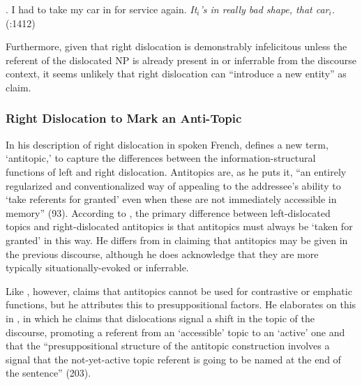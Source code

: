 \documentclass[titlepage,12pt]{article}
\begin{document}
\ex. I had to take my car in for service again. \textit{It$_i$'s in really bad shape, that car$_i$.}\\
\phantom{x}\hfill (\citealt{huddleston_cambridge_2002}:1412)

Furthermore, given that right dislocation is demonstrably infelicitous unless the referent of the dislocated NP is already present in or inferrable from the discourse context, it seems unlikely that right dislocation can ``introduce a new entity'' as \citeauthor{ziv_right_1994} claim. 

\subsubsection{Right Dislocation to Mark an Anti-Topic}

In his description of right dislocation in spoken French, \citet{lambrecht_topic_1981} defines a new term, `antitopic,' to capture the differences between the information-structural functions of left and right dislocation. Antitopics are, as he puts it, ``an entirely regularized and conventionalized way of appealing to the addressee's ability to `take referents for granted' even when these are not immediately accessible in memory'' (93). According to \citeauthor{lambrecht_topic_1981}, the primary difference between left-dislocated topics and right-dislocated antitopics is that antitopics must always be `taken for granted' in this way. He differs from \citet{ziv_right_1994} in claiming that antitopics may be given in the previous discourse, although he does acknowledge that they are more typically situationally-evoked or inferrable.

Like \citeauthor{ziv_right_1994}, however, \citeauthor{lambrecht_topic_1981} claims that antitopics cannot be used for contrastive or emphatic functions, but he attributes this to presuppositional factors. He elaborates on this in \citealt{lambrecht_information_2000}, in which he claims that dislocations signal a shift in the topic of the discourse, promoting a referent from an `accessible' topic to an `active' one and that the ``presuppositional structure of the antitopic construction involves a signal that the not-yet-active topic referent is going to be named at the end of the sentence'' (203).
\end{document}
